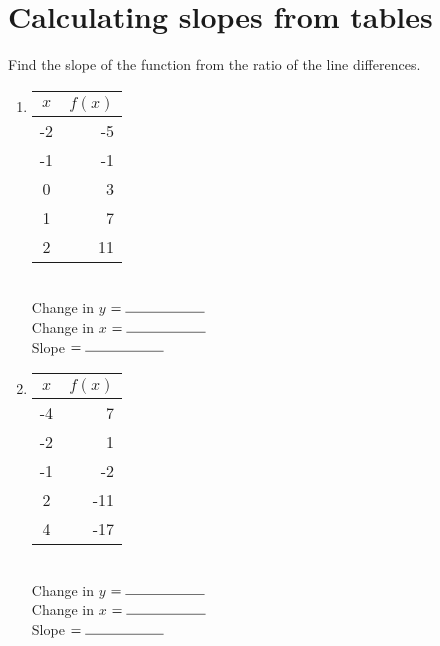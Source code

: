 \documentclass[12pt, oneside]{article}
\begin{document}
\section{Calculating slopes from tables}

\item Find the slope of the function from the ratio of the line differences.

  \begin{multicols}{2}
  \begin{enumerate}
    \item
      \begin{tabular}{|c|r|}
      \hline
      $x$ & $f(x)$\\
      \hline
      -2 & -5 \\
      \hline
      -1 & -1 \\
      \hline
      0 & 3 \\
      \hline
      1 & 7 \\
      \hline
      2 & 11 \\
      \hline
      \end{tabular}\\[0.85cm]

      Change in $y$ $= \rule{2cm}{0.15mm}$ \\[0.5cm]
      Change in $x$ $= \rule{2cm}{0.15mm}$ \\[0.5cm]
      Slope $= \rule{2cm}{0.15mm}$\\


    \item
      \begin{tabular}{|c|r|}
      \hline
      $x$ & $f(x)$\\
      \hline
      -4 & 7 \\
      \hline
      -2 & 1 \\
      \hline
      -1 & -2 \\
      \hline
      2 & -11 \\
      \hline
      4 & -17 \\
      \hline
      \end{tabular}\\[0.85cm]

      Change in $y$ $= \rule{2cm}{0.15mm}$ \\[0.5cm]
      Change in $x$ $= \rule{2cm}{0.15mm}$ \\[0.5cm]
      Slope $= \rule{2cm}{0.15mm}$\\

    \end{enumerate}
    \end{multicols}
\end{document}
